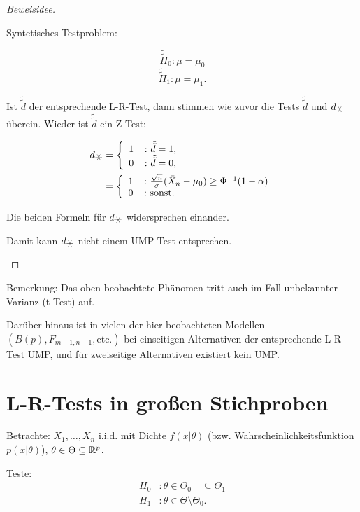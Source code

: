 \documentclass{tstextbook}
\begin{document}
\begin{example}
\begin{proof}[Beweisidee]
\begin{itemize}
		Syntetisches Testproblem:
		
		\[
		\tilde{\tilde{H}}_0\colon\mu=\mu_0
		\]
		\[
		\tilde{\tilde{H}}_1\colon\mu=\mu_1.
		\]
		
		Ist $\tilde{\tilde{d}}$ der entsprechende L-R-Test, dann stimmen wie zuvor die Tests $\tilde{\tilde{d}}$ und $d_{\hexstar}$ überein. Wieder ist $\tilde{\tilde{d}}$ ein Z-Test:
		
		\[
		\begin{aligned}
			d_{\hexstar} & = \left\{\begin{array}{ll}
				1 & \colon \tilde{\tilde{d}}=1, \\
				0 & \colon \tilde{\tilde{d}}=0,
			\end{array}\right. \\
			& = \left\{\begin{array}{ll}
				1 & \colon \frac{\sqrt{n}}{\sigma}(\bar{X}_n-\mu_0)\ge\Phi^{-1}(1-\alpha) \\
				0 & \colon \text{sonst}.
			\end{array}\right.
		\end{aligned}
		\]
		
		Die beiden Formeln für $ d_{\hexstar} $ widersprechen einander. 
		
		Damit kann $ d_{\hexstar} $ nicht einem UMP-Test entsprechen.
	\end{itemize}
\end{proof}

\end{example}

\begin{remark}
	Bemerkung: Das oben beobachtete Phänomen tritt auch im Fall unbekannter Varianz (t-Test) auf. 
	
	Darüber hinaus ist in vielen der hier beobachteten Modellen $ (B(p), F_{m-1,n-1}, \text{etc.}) $ bei einseitigen Alternativen der entsprechende L-R-Test UMP, und für zweiseitige Alternativen existiert kein UMP.
\end{remark}

\section{L-R-Tests in großen Stichproben}

Betrachte: $ X_1,\ldots,X_n $ i.i.d. mit Dichte $ f(x|\theta) $ (bzw. Wahrscheinlichkeitsfunktion $ p(x|\theta) $), $ \theta\in\Theta\subseteq\mathbb R^p $. 

Teste: 
	\[\begin{aligned}
	H_0 &\colon \theta\in\Theta_0 \quad \subseteq \Theta_1 \\
	H_1 &\colon \theta\in\Theta\setminus\Theta_0.
	\end{aligned}
	\]
	
\end{document}

